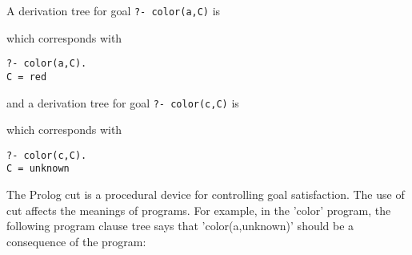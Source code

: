 A derivation tree for goal \verb|?- color(a,C)| is


which corresponds with

\begin{verbatim}
?- color(a,C). 
C = red 
\end{verbatim}

and a derivation tree for goal \verb|?- color(c,C)| is


which corresponds with

\begin{verbatim}
?- color(c,C). 
C = unknown 
\end{verbatim}

The Prolog cut is a procedural device for controlling goal satisfaction. The use
of cut affects the meanings of programs. For example, in the 'color' program,
the following program clause tree says that 'color(a,unknown)' should be a
consequence of the program:


\begin{verbatim}
\end{verbatim}

\begin{verbatim}
\end{verbatim}

\begin{verbatim}
\end{verbatim}

\begin{verbatim}
\end{verbatim}

\begin{verbatim}
\end{verbatim}

\begin{verbatim}
\end{verbatim}

